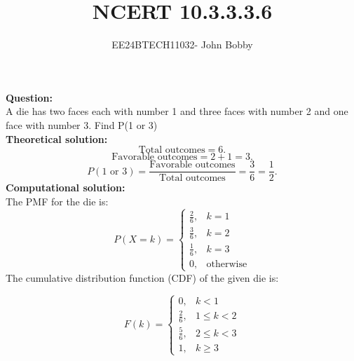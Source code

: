\documentclass[journal,12pt,onecolumn]{IEEEtran}
\theoremstyle{remark}
\begin{document}

\vspace{3cm}

\title{\textbf{NCERT 10.3.3.3.6}}
\author{EE24BTECH11032- John Bobby}
\maketitle
\bigskip
\textbf{Question:}\\
 A die has two faces each with number 1 and three faces with number 2 and one face with number 3.
 Find P(1 or 3)\\
 \textbf{Theoretical solution: }\\
	\[
	\text{Total outcomes} = 6.
	\]
	\[
	\text{Favorable outcomes} = 2+1=3.
	\]
	\[
	P(\text{1 or 3}) = \frac{\text{Favorable outcomes}}{\text{Total outcomes}} = \frac{3}{6} = \frac{1}{2}.
	\]
\textbf{Computational solution: }\\
	The PMF for the  die is:
\[
P(X = k) =
\begin{cases}
    \frac{2}{6}, & k = 1 \\
    \frac{3}{6}, & k = 2 \\
    \frac{1}{6}, & k = 3 \\
    0, & \text{otherwise}
\end{cases}
\]
The cumulative distribution function (CDF) of the given die is:

\[
F(k) =
\begin{cases}
    0, & k < 1 \\
    \frac{2}{6}, & 1 \leq k < 2 \\
    \frac{5}{6}, & 2 \leq k < 3 \\
    1, & k \geq 3
\end{cases}
\]
\end{document}
